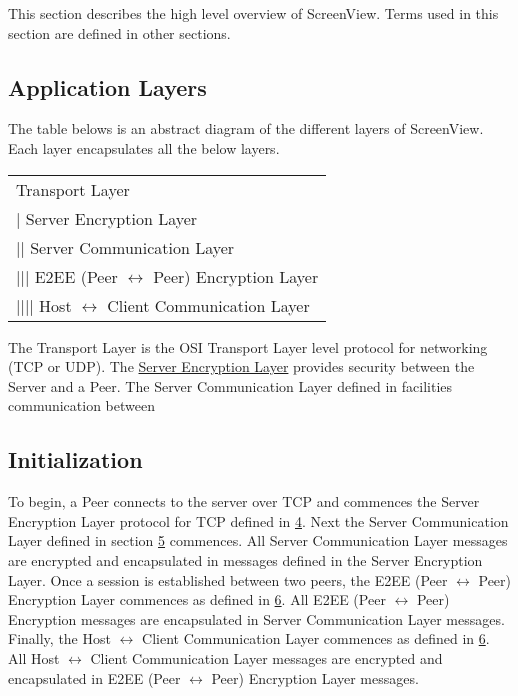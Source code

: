 \documentclass{article}
\begin{document}
    This section describes the high level overview of ScreenView. Terms used in this section are defined in other sections.\\

    \subsection{Application Layers}

    The table belows is an abstract diagram of the different layers of ScreenView. Each layer encapsulates all the
    below layers.

    \begin{center}
        \begin{tabular}{|l|}
            \hline
            Transport Layer                                         \\
            | Server Encryption Layer                               \\
            || Server Communication Layer                           \\
            ||| E2EE (Peer $\leftrightarrow$ Peer) Encryption Layer \\
            |||| Host $\leftrightarrow$ Client Communication Layer  \\
            \hline
        \end{tabular}
    \end{center}

    The Transport Layer is the OSI Transport Layer level protocol for networking (TCP or UDP). The \hyperlink{section.3}{Server
    Encryption Layer} provides security between the Server and a Peer. The Server Communication Layer defined in facilities communication between

    \subsection{Initialization}

    To begin, a Peer connects to the server over TCP and commences the Server Encryption Layer protocol for TCP
    defined in \hyperlink{section.4}{4}. Next the Server Communication Layer defined in section \hyperlink{section
    .5}{5} commences. All Server Communication Layer messages are encrypted and encapsulated in messages defined in
    the Server Encryption Layer. Once a session is established between two peers, the E2EE (Peer $\leftrightarrow$ Peer)
    Encryption Layer commences as defined in \hyperlink{section.6}{6}. All E2EE (Peer $\leftrightarrow$ Peer)
    Encryption messages are encapsulated in Server Communication Layer messages. Finally, the Host $\leftrightarrow$
    Client Communication Layer commences as defined in \hyperlink{section.6}{6}. All Host $\leftrightarrow$ Client
    Communication Layer messages are encrypted and encapsulated in E2EE (Peer $\leftrightarrow$ Peer) Encryption
    Layer messages.
\end{document}
